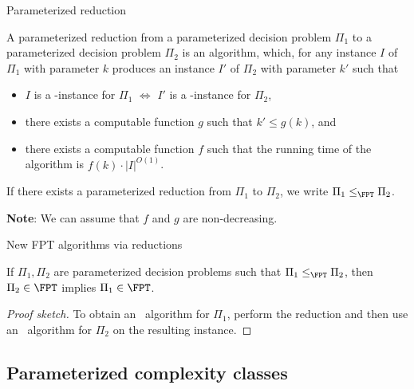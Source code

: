 \begin{frame}{Parameterized reduction}
 \begin{definition}
 	A \alert{parameterized reduction} from a parameterized decision problem $\Pi_1$ to a parameterized decision problem $\Pi_2$ is an algorithm, which, for any instance $I$ of $\Pi_1$ with parameter $k$ produces an instance $I'$ of $\Pi_2$ with parameter $k'$ such that
 	\begin{itemize}
 		\item $I$ is a \Yes-instance for $\Pi_1$ $\Leftrightarrow$ $I'$ is a \Yes-instance for $\Pi_2$,
 		\item there exists a computable function $g$ such that $k'\le g(k)$, and
 		\item there exists a computable function $f$ such that the running time of the algorithm is $f(k) \cdot |I|^{O(1)}$.
  	\end{itemize}
 	If there exists a parameterized reduction from $\Pi_1$ to $\Pi_2$, we write $\Pi_1 \le_{\FPT} \Pi_2$.
 \end{definition}
 
 \noindent
 \textbf{Note}: We can assume that $f$ and $g$ are non-decreasing.
\end{frame}


\begin{frame}{New FPT algorithms via reductions}
	
	\begin{lemma}
		If $\Pi_1, \Pi_2$ are parameterized decision problems such that $\Pi_1 \le_{\FPT} \Pi_2$, then\\ $\Pi_2 \in \FPT$ implies $\Pi_1\in \FPT$.
	\end{lemma}
	\begin{proof}[Proof sketch]
		To obtain an \FPT\ algorithm for $\Pi_1$, perform the reduction and then use an \FPT\ algorithm for $\Pi_2$ on the resulting instance.
	\end{proof}
	
\end{frame}


\subsection{Parameterized complexity classes}

